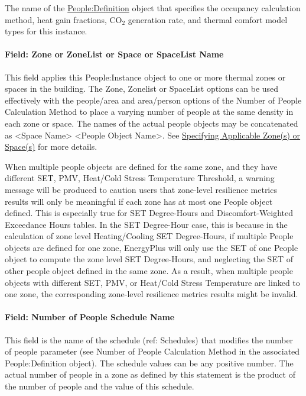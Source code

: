 The name of the \hyperref[peopledefinition]{People:Definition} object that specifies the occupancy calculation method, heat gain fractions, CO\(_{2}\) generation rate, and thermal comfort model types for this instance.

\paragraph{Field: Zone or ZoneList or Space or SpaceList Name}\label{field-zone-or-zonelist-name-000-people-instance}

This field applies this People:Instance object to one or more thermal zones or spaces in the building. The Zone, Zonelist or SpaceList options can be used effectively with the people/area and area/person options of the Number of People Calculation Method to place a varying number of people at the same density in each zone or space. The names of the actual people objects may be concatenated as \textless{}Space Name\textgreater{} \textless{}People Object Name\textgreater{}. See \hyperref[specifying-applicable-zones-or-spaces]{Specifying Applicable Zone(s) or Space(s)} for more details.

When multiple people objects are defined for the same zone, and they have different SET, PMV, Heat/Cold Stress Temperature Threshold, a warning message will be produced to caution users that zone-level resilience metrics results will only be meaningful if each zone has at most one People object defined. This is especially true for SET Degree-Hours and Discomfort-Weighted Exceedance Hours tables. In the SET Degree-Hour case, this is because in the calculation of zone level Heating/Cooling SET Degree-Hours, if multiple People objects are defined for one zone, EnergyPlus will only use the SET of one People object to compute the zone level SET Degree-Hours, and neglecting the SET of other people object defined in the same zone. As a result, when multiple people objects with different SET, PMV, or Heat/Cold Stress Temperature are linked to one zone, the corresponding zone-level resilience metrics results might be invalid.

\paragraph{Field: Number of People Schedule Name}\label{field-number-of-people-schedule-name-people-instance}

This field is the name of the schedule (ref: Schedules) that modifies the number of people parameter (see Number of People Calculation Method in the associated People:Definition object). The schedule values can be any positive number. The actual number of people in a zone as defined by this statement is the product of the number of people and the value of this schedule.

